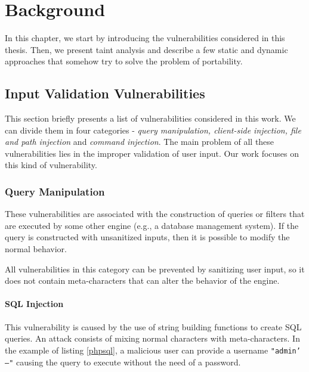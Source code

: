 

\chapter{Background}
\label{chapter:background}
In this chapter, we start by introducing the vulnerabilities considered in this thesis. Then, we present taint analysis and describe a few static and dynamic approaches that somehow try to solve the problem of portability.


\section{Input Validation Vulnerabilities}
\label{vulnerabilities}
This section briefly presents a list of vulnerabilities considered in this work. We can divide them in four categories \cite{iberia} - \textit{query manipulation, client-side injection, file and path injection} and \textit{command injection}. The main problem of all these vulnerabilities lies in the improper validation of user input. Our work focuses on this kind of vulnerability.

\subsection{Query Manipulation}
These vulnerabilities are associated with the construction of queries or filters that are executed by some other engine (e.g., a database management system). If the query is constructed with unsanitized inputs, then it is possible to modify the normal behavior. 

All vulnerabilities in this category can be prevented by sanitizing user input, so it does not contain meta-characters that can alter the behavior of the engine.


\subsubsection{SQL Injection} 
This vulnerability is caused by the use of string building functions to create SQL queries. An attack consists of mixing normal characters with meta-characters. In the example of listing \ref{phpsql}, a malicious user can provide a username \texttt{"admin' ---"} causing the query to execute without the need of a password.  

